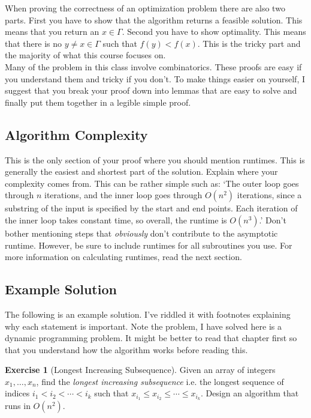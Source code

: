 \documentclass[10pt]{article}
\theoremstyle{plain}
\theoremstyle{definition}
\newtheorem{exer}[thm]{Exercise}
\numberwithin{equation}{section}
\numberwithin{figure}{section}
\begin{document}
\noindent When proving the correctness of an optimization problem there are also two parts. First you have to show that the algorithm returns a feasible solution. This means that you return an $x \in \Gamma$. Second you have to show optimality. This means that there is no $y \neq x \in \Gamma$ such that $f(y) < f(x)$. This is the tricky part and the majority of what this course focuses on. \\

\noindent Many of the problem in this class involve combinatorics. These proofs are easy if you understand them and tricky if you don't. To make things easier on yourself, I suggest that you break your proof down into lemmas that are easy to solve and finally put them together in a legible simple proof.

\subsection{Algorithm Complexity}
This is the only section of your proof where you should mention runtimes. This is generally the easiest and shortest part of the solution. Explain where your complexity comes from. This can be rather simple such as: `The outer loop goes through $n$ iterations, and the inner loop goes through $O(n^2)$ iterations, since a substring of the input is specified by the start and end points. Each iteration of the inner loop takes constant time, so overall, the runtime is $O(n^3)$.' Don't bother mentioning steps that \emph{obviously} don't contribute to the asymptotic runtime. However, be sure to include runtimes for all subroutines you use. For more information on calculating runtimes, read the next section.


\subsection{Example Solution}
The following is an example solution. I've riddled it with footnotes explaining why each statement is important. Note the problem, I have solved here is a dynamic programming problem. It might be better to read that chapter first so that you understand how the algorithm works before reading this.

\begin{exer}[Longest Increasing Subsequence]
Given an array of integers $x_1, \ldots, x_n$, find the \emph{longest increasing subsequence} i.e. the longest sequence of indices $i_1 < i_2 < \cdots < i_k$ such that $x_{i_1} \leq x_{i_2} \leq \cdots \leq x_{i_k}$. Design an algorithm that runs in $O(n^2)$.
\end{exer}
\end{document}
